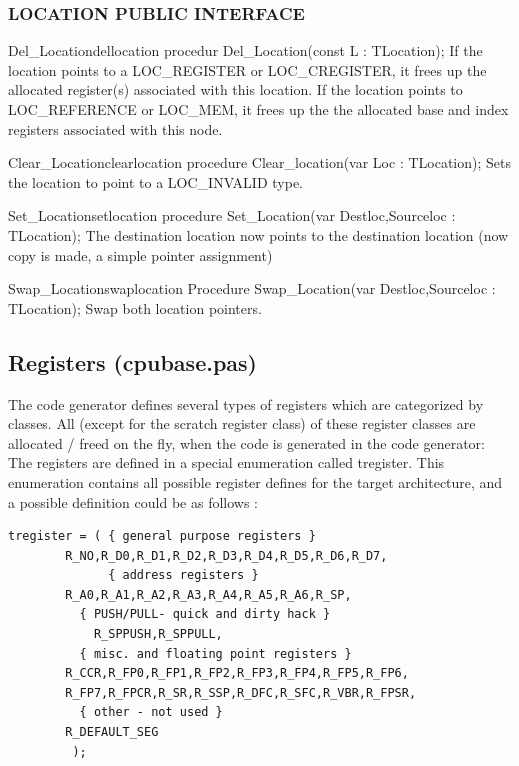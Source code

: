 \documentclass [a4paper,12pt]{article}
\begin{document}
\subsubsection{LOCATION PUBLIC INTERFACE}
\label{subsubsec:location}

\begin{procedurel}{Del{\_}Location}{dellocation}
\Declaration
procedur Del{\_}Location(const L : TLocation);
\Description
If the location points to a LOC{\_}REGISTER or LOC{\_}CREGISTER, it frees up
the allocated register(s) associated with this location. If the location
points to LOC{\_}REFERENCE or LOC{\_}MEM, it frees up the the allocated base
and index registers associated with this node.
\end{procedurel}

\begin{procedurel}{Clear{\_}Location}{clearlocation}
\Declaration
procedure Clear{\_}location(var Loc : TLocation);
\Description
Sets the location to point to a LOC{\_}INVALID type.
\end{procedurel}

\begin{procedurel}{Set{\_}Location}{setlocation}
\Declaration
procedure Set{\_}Location(var Destloc,Sourceloc : TLocation);
\Description
The destination location now points to the destination location (now copy is
made, a simple pointer assignment)
\end{procedurel}

\begin{procedurel}{Swap{\_}Location}{swaplocation}
\Declaration
Procedure Swap{\_}Location(var Destloc,Sourceloc : TLocation);
\Description
Swap both location pointers.
\end{procedurel}

\subsection{Registers (cpubase.pas)}
\label{subsec:registers}

The code generator defines several types of registers which are categorized
by classes. All (except for the scratch register class) of these register
classes are allocated / freed on the fly, when the code is generated in the
code generator: The registers are defined in a special enumeration called
tregister. This enumeration contains all possible register defines for the
target architecture, and a possible definition could be as follows :

\begin{verbatim}
tregister = ( { general purpose registers }
        R_NO,R_D0,R_D1,R_D2,R_D3,R_D4,R_D5,R_D6,R_D7,
              { address registers }
        R_A0,R_A1,R_A2,R_A3,R_A4,R_A5,R_A6,R_SP,
          { PUSH/PULL- quick and dirty hack }
            R_SPPUSH,R_SPPULL,
          { misc. and floating point registers }
        R_CCR,R_FP0,R_FP1,R_FP2,R_FP3,R_FP4,R_FP5,R_FP6,
        R_FP7,R_FPCR,R_SR,R_SSP,R_DFC,R_SFC,R_VBR,R_FPSR,
          { other - not used }
        R_DEFAULT_SEG
         );

\end{verbatim}
\end{document}
